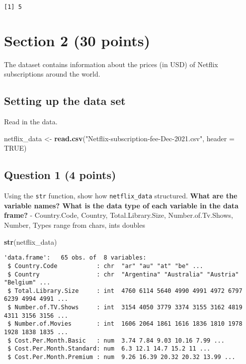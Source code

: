 \documentclass[
]{article}
\newenvironment{Shaded}{\begin{snugshade}}{\end{snugshade}}
\newcommand{\AttributeTok}[1]{\textcolor[rgb]{0.13,0.29,0.53}{#1}}
\newcommand{\ConstantTok}[1]{\textcolor[rgb]{0.56,0.35,0.01}{#1}}
\newcommand{\FunctionTok}[1]{\textcolor[rgb]{0.13,0.29,0.53}{\textbf{#1}}}
\newcommand{\NormalTok}[1]{#1}
\newcommand{\OtherTok}[1]{\textcolor[rgb]{0.56,0.35,0.01}{#1}}
\newcommand{\StringTok}[1]{\textcolor[rgb]{0.31,0.60,0.02}{#1}}
\begin{document}
\begin{verbatim}
[1] 5
\end{verbatim}

\section{Section 2 (30 points)}\label{section-2-30-points}

The dataset contains information about the prices (in USD) of Netflix
subscriptions around the world.

\subsection{Setting up the data set}\label{setting-up-the-data-set}

Read in the data.

\begin{Shaded}
\begin{Highlighting}[]
\NormalTok{netflix\_data }\OtherTok{\textless{}{-}} \FunctionTok{read.csv}\NormalTok{(}\StringTok{"Netflix{-}subscription{-}fee{-}Dec{-}2021.csv"}\NormalTok{, }\AttributeTok{header =} \ConstantTok{TRUE}\NormalTok{)}
\end{Highlighting}
\end{Shaded}

\subsection{Question 1 (4 points)}\label{question-1-4-points}

Using the \texttt{str} function, show how \texttt{netflix\_data}
structured. \textbf{What are the variable names? What is the data type
of each variable in the data frame?} - Country.Code, Country,
Total.Library.Size, Number.of.Tv.Shows, Number, Types range from chars,
ints doubles

\begin{Shaded}
\begin{Highlighting}[]
\FunctionTok{str}\NormalTok{(netflix\_data)}
\end{Highlighting}
\end{Shaded}

\begin{verbatim}
'data.frame':   65 obs. of  8 variables:
 $ Country.Code           : chr  "ar" "au" "at" "be" ...
 $ Country                : chr  "Argentina" "Australia" "Austria" "Belgium" ...
 $ Total.Library.Size     : int  4760 6114 5640 4990 4991 4972 6797 6239 4994 4991 ...
 $ Number.of.TV.Shows     : int  3154 4050 3779 3374 3155 3162 4819 4311 3156 3156 ...
 $ Number.of.Movies       : int  1606 2064 1861 1616 1836 1810 1978 1928 1838 1835 ...
 $ Cost.Per.Month.Basic   : num  3.74 7.84 9.03 10.16 7.99 ...
 $ Cost.Per.Month.Standard: num  6.3 12.1 14.7 15.2 11 ...
 $ Cost.Per.Month.Premium : num  9.26 16.39 20.32 20.32 13.99 ...
\end{verbatim}
\end{document}
